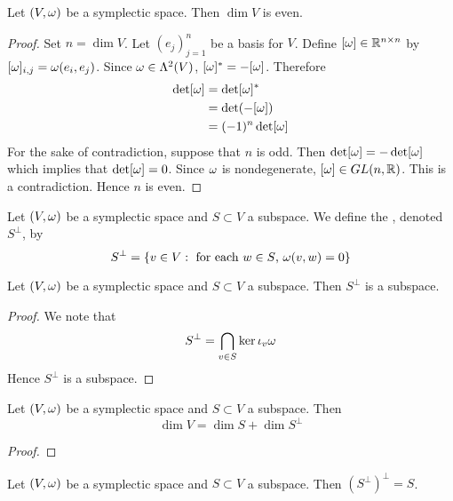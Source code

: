 \documentclass{book}
\begin{document}
	
	\begin{ex}
		Let $(V, \omega)$ be a symplectic space. Then $\dim V$ is even. 
	\end{ex}
	
	\begin{proof}
		Set $n = \dim V$. Let $(e_j)_{j=1}^n$ be a basis for $V$. Define $[\omega] \in \mathbb{R}^{n \times n}$ by $[\omega]_{i,j} = \omega(e_i, e_j)$. Since $\omega \in \Lambda^2(V)$, $[\omega]^* = - [\omega]$. Therefore
		\begin{align*}
			\det[\omega]
			& = \det [\omega]^* \\
			& = \det (- [\omega]) \\
			& = (-1)^{n} \det [\omega] 
		\end{align*}
		For the sake of contradiction, suppose that $n$ is odd. Then $\det [\omega] = - \det [\omega]$ which implies that $\det [\omega] = 0$. Since $\omega$ is nondegenerate, $[\omega] \in GL(n, \mathbb{R})$. This is a contradiction. Hence $n$ is even. 
	\end{proof}
	
	\begin{defn}
		Let $(V, \omega)$ be a symplectic space and $S \subset V$ a subspace. We define the , denoted $S^{\perp}$, by 
		$$S^{\perp} = \{v \in V: \text{ for each $w \in S$, $\omega(v, w) = 0$}\}$$
	\end{defn}
	
	\begin{ex}
		Let $(V, \omega)$ be a symplectic space and $S \subset V$ a subspace. Then $S^{\perp}$ is a subspace.
	\end{ex}
	
	\begin{proof}
		We note that 
		$$S^{\perp} = \bigcap_{v \in S} \ker \iota_v\omega$$ 
		Hence $S^{\perp}$ is a subspace.
	\end{proof}
	
	
	\begin{ex}
		Let $(V, \omega)$ be a symplectic space and $S \subset V$ a subspace. Then 
		$$\dim V = \dim S + \dim S^{\perp}$$ 
	\end{ex}
	
	\begin{proof}
		
	\end{proof}
	
	\begin{ex}
		Let $(V, \omega)$ be a symplectic space and $S \subset V$ a subspace. Then $(S^{\perp})^{\perp} = S$. 
	\end{ex}
	
\end{document}
